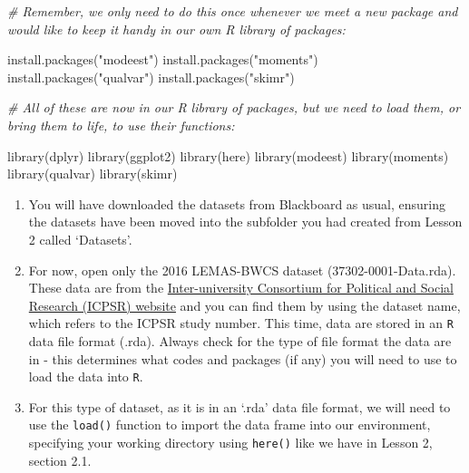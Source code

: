 \documentclass[
]{book}
\newenvironment{Shaded}{\begin{snugshade}}{\end{snugshade}}
\newcommand{\CommentTok}[1]{\textcolor[rgb]{0.56,0.35,0.01}{\textit{#1}}}
\newcommand{\FunctionTok}[1]{\textcolor[rgb]{0.00,0.00,0.00}{#1}}
\newcommand{\NormalTok}[1]{#1}
\newcommand{\StringTok}[1]{\textcolor[rgb]{0.31,0.60,0.02}{#1}}
\begin{document}
\begin{Shaded}
\begin{Highlighting}[]
\CommentTok{\# Remember, we only need to do this once whenever we meet a new package and would like to keep it handy in our own R library of packages:}

\FunctionTok{install.packages}\NormalTok{(}\StringTok{"modeest"}\NormalTok{)}
\FunctionTok{install.packages}\NormalTok{(}\StringTok{"moments"}\NormalTok{)}
\FunctionTok{install.packages}\NormalTok{(}\StringTok{"qualvar"}\NormalTok{)}
\FunctionTok{install.packages}\NormalTok{(}\StringTok{"skimr"}\NormalTok{)}
\end{Highlighting}
\end{Shaded}

\begin{Shaded}
\begin{Highlighting}[]
\CommentTok{\# All of these are now in our R library of packages, but we need to load them, or \textquotesingle{}bring them to life\textquotesingle{}, to use their functions:}

\FunctionTok{library}\NormalTok{(dplyr)}
\FunctionTok{library}\NormalTok{(ggplot2)}
\FunctionTok{library}\NormalTok{(here)}
\FunctionTok{library}\NormalTok{(modeest)}
\FunctionTok{library}\NormalTok{(moments)}
\FunctionTok{library}\NormalTok{(qualvar)}
\FunctionTok{library}\NormalTok{(skimr)}
\end{Highlighting}
\end{Shaded}

\begin{enumerate}
\def\labelenumi{\arabic{enumi}.}
\setcounter{enumi}{2}
\item
  You will have downloaded the datasets from Blackboard as usual, ensuring the datasets have been moved into the subfolder you had created from Lesson 2 called `Datasets'.
\item
  For now, open only the 2016 LEMAS-BWCS dataset (37302-0001-Data.rda). These data are from the \href{https://www.icpsr.umich.edu/web/pages/}{Inter-university Consortium for Political and Social Research (ICPSR) website} and you can find them by using the dataset name, which refers to the ICPSR study number. This time, data are stored in an \texttt{R} data file format (.rda). Always check for the type of file format the data are in - this determines what codes and packages (if any) you will need to use to load the data into \texttt{R}.
\item
  For this type of dataset, as it is in an `.rda' data file format, we will need to use the \texttt{load()} function to import the data frame into our environment, specifying your working directory using \texttt{here()} like we have in Lesson 2, section 2.1.
\end{enumerate}
\end{document}
